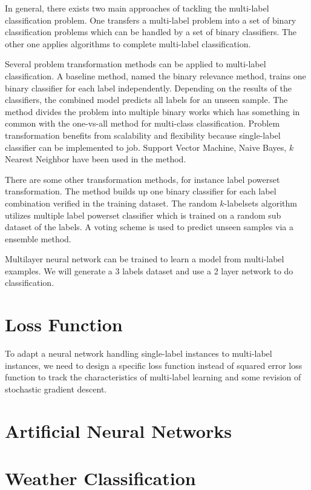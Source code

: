 In general, there exists two main approaches of tackling the multi-label classification problem. One transfers a multi-label problem into a set of binary classification problems which can be handled by a set of binary classifiers. The other one applies algorithms to complete multi-label classification. 

Several problem transformation methods can be applied to multi-label classification. A baseline method, named the binary relevance method\citep{read2011classifier}, trains one binary classifier for each label independently. Depending on the results of the classifiers, the combined model predicts all labels for an unseen sample. The method divides the problem into multiple binary works which has something in common with the one-vs-all method for multi-class classification. Problem transformation benefits from scalability and flexibility because single-label classifier can be implemented to job. Support Vector Machine, Naive Bayes, $k$ Nearest Neighbor have been used in the method\citep{read2011classifier}.

There are some other transformation methods, for instance label powerset transformation. The method builds up one binary classifier for each label combination verified in the training dataset\citep{tsoumakas2006multi}. The random $k$-labelsets algorithm\citep{tsoumakas2007random} utilizes multiple label powerset classifier which is trained on a random sub dataset of the labels. A voting scheme is used to predict unseen samples via a ensemble method.

Multilayer neural network can be trained to learn a model from multi-label examples. We will generate a 3 labels dataset and use a 2 layer network to do classification.

\section{Loss Function}

To adapt a neural network handling single-label instances to multi-label instances, we need to design a specific loss function instead of squared error loss function to track the characteristics of multi-label learning and some revision of stochastic gradient descent. 

\section{Artificial Neural Networks}



\section{Weather Classification}




